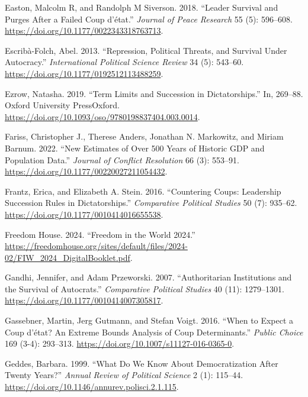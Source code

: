 \documentclass[
  12pt,
]{report}
\newlength{\cslhangindent}
\newenvironment{CSLReferences}[2] %
 {\begin{list}{}{%
  \setlength{\itemindent}{0pt}
  \setlength{\leftmargin}{0pt}
  \setlength{\parsep}{0pt}
  \ifodd #1
   \setlength{\leftmargin}{\cslhangindent}
   \setlength{\itemindent}{-1\cslhangindent}
  \fi
  \setlength{\itemsep}{#2\baselineskip}}}
 {\end{list}}
\begin{document}
\begin{CSLReferences}{1}{0}
Easton, Malcolm R, and Randolph M Siverson. 2018. {``Leader Survival and
Purges After a Failed Coup d{'}état.''} \emph{Journal of Peace Research}
55 (5): 596--608. \url{https://doi.org/10.1177/0022343318763713}.

Escribà-Folch, Abel. 2013. {``Repression, Political Threats, and
Survival Under Autocracy.''} \emph{International Political Science
Review} 34 (5): 543--60. \url{https://doi.org/10.1177/0192512113488259}.

Ezrow, Natasha. 2019. {``Term Limits and Succession in Dictatorships.''}
In, 269--88. Oxford University PressOxford.
\url{https://doi.org/10.1093/oso/9780198837404.003.0014}.

Fariss, Christopher J., Therese Anders, Jonathan N. Markowitz, and
Miriam Barnum. 2022. {``New Estimates of Over 500 Years of Historic GDP
and Population Data.''} \emph{Journal of Conflict Resolution} 66 (3):
553--91. \url{https://doi.org/10.1177/00220027211054432}.

Frantz, Erica, and Elizabeth A. Stein. 2016. {``Countering Coups:
Leadership Succession Rules in Dictatorships.''} \emph{Comparative
Political Studies} 50 (7): 935--62.
\url{https://doi.org/10.1177/0010414016655538}.

Freedom House. 2024. {``Freedom in the World 2024.''}
\url{https://freedomhouse.org/sites/default/files/2024-02/FIW_2024_DigitalBooklet.pdf}.

Gandhi, Jennifer, and Adam Przeworski. 2007. {``Authoritarian
Institutions and the Survival of Autocrats.''} \emph{Comparative
Political Studies} 40 (11): 1279--1301.
\url{https://doi.org/10.1177/0010414007305817}.

Gassebner, Martin, Jerg Gutmann, and Stefan Voigt. 2016. {``When to
Expect a Coup d{'}état? An Extreme Bounds Analysis of Coup
Determinants.''} \emph{Public Choice} 169 (3-4): 293--313.
\url{https://doi.org/10.1007/s11127-016-0365-0}.

Geddes, Barbara. 1999. {``What Do We Know About Democratization After
Twenty Years?''} \emph{Annual Review of Political Science} 2 (1):
115--44. \url{https://doi.org/10.1146/annurev.polisci.2.1.115}.


\end{CSLReferences}
\end{document}
